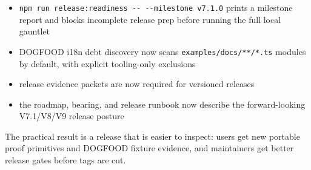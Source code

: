 \begin{itemize}
\tightlist
\item
  \texttt{n\allowbreak{}p\allowbreak{}m\allowbreak{} \allowbreak{}r\allowbreak{}u\allowbreak{}n\allowbreak{} \allowbreak{}r\allowbreak{}e\allowbreak{}l\allowbreak{}e\allowbreak{}a\allowbreak{}s\allowbreak{}e\allowbreak{}:\allowbreak{}r\allowbreak{}e\allowbreak{}a\allowbreak{}d\allowbreak{}i\allowbreak{}n\allowbreak{}e\allowbreak{}s\allowbreak{}s\allowbreak{} \allowbreak{}-\allowbreak{}-\allowbreak{} \allowbreak{}-\allowbreak{}-\allowbreak{}m\allowbreak{}i\allowbreak{}l\allowbreak{}e\allowbreak{}s\allowbreak{}t\allowbreak{}o\allowbreak{}n\allowbreak{}e\allowbreak{} \allowbreak{}v\allowbreak{}7\allowbreak{}.\allowbreak{}1\allowbreak{}.\allowbreak{}0} prints a milestone report and blocks incomplete release prep before running the full local gauntlet
\item
  DOGFOOD i18n debt discovery now scans \texttt{e\allowbreak{}x\allowbreak{}a\allowbreak{}m\allowbreak{}p\allowbreak{}l\allowbreak{}e\allowbreak{}s\allowbreak{}/\allowbreak{}d\allowbreak{}o\allowbreak{}c\allowbreak{}s\allowbreak{}/\allowbreak{}*\allowbreak{}*\allowbreak{}/\allowbreak{}*\allowbreak{}.\allowbreak{}t\allowbreak{}s} modules by default, with explicit tooling-only exclusions
\item
  release evidence packets are now required for versioned releases
\item
  the roadmap, bearing, and release runbook now describe the forward-looking V7.1/V8/V9 release posture
\end{itemize}

The practical result is a release that is easier to inspect: users get new portable proof primitives and DOGFOOD fixture evidence, and maintainers get better release gates before tags are cut.

